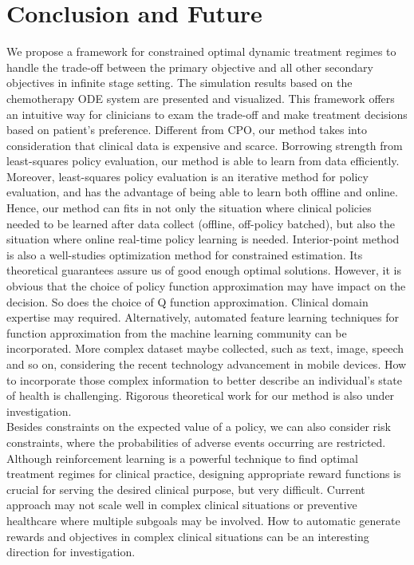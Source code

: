 \documentclass{article}
\begin{document}
\section{Conclusion and Future}
We propose a framework for constrained optimal dynamic treatment regimes to handle the trade-off between the primary objective and all other secondary objectives in infinite stage setting. The simulation results based on the chemotherapy ODE system are presented and visualized. This framework offers an intuitive way for clinicians to exam the trade-off and make treatment decisions based on patient's preference. Different from CPO, our method takes into consideration that clinical data is expensive and scarce. Borrowing strength from least-squares policy evaluation, our method is able to learn from data efficiently. Moreover, least-squares policy evaluation is an iterative method for policy evaluation, and has the advantage of being able to learn both offline and online. Hence, our method can fits in not only the situation where clinical policies needed to be learned after data collect (offline, off-policy batched), but also the situation where online real-time policy learning is needed. Interior-point method is also a well-studies optimization method for constrained estimation. Its theoretical guarantees assure us of good enough optimal solutions. However, it is obvious that the choice of policy function approximation may have impact on the decision. So does the choice of Q function approximation. Clinical domain expertise may required. Alternatively, automated feature learning techniques for function approximation from the machine learning community can be incorporated. More complex dataset maybe collected, such as text, image, speech and so on, considering the recent technology advancement in mobile devices. How to incorporate those complex information to better describe an individual's state of health is challenging. Rigorous theoretical work for our method is also under investigation.\\

Besides constraints on the expected value of a policy, we can also consider risk constraints, where the probabilities of adverse events occurring are restricted. Although reinforcement learning is a powerful technique to find optimal treatment regimes for clinical practice, designing appropriate reward functions is crucial for serving the desired clinical purpose, but very difficult. Current approach may not scale well in complex clinical situations or preventive healthcare where multiple subgoals may be involved. How to automatic generate rewards and objectives in complex clinical situations can be an interesting direction for investigation.\\
\end{document}
